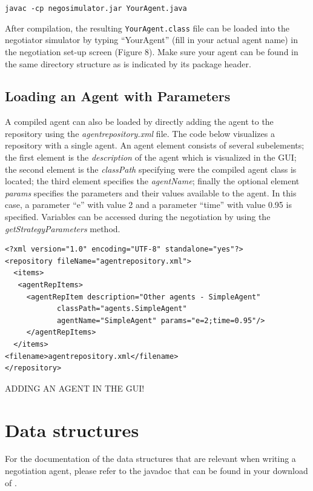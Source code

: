 \documentclass[]{article}
\begin{document}
\texttt{javac -cp negosimulator.jar YourAgent.java}

After compilation, the resulting \texttt{YourAgent.class} file can be loaded into the negotiator simulator by typing ``YourAgent'' (fill in your actual agent name) in the negotiation set-up screen (Figure 8). Make sure your agent can be found in the same directory structure as is indicated by its package header.

\subsection{Loading an Agent with Parameters}
A compiled agent can also be loaded by directly adding the agent to the repository using the \textit{agentrepository.xml} file. The code below visualizes a repository with a single agent. An agent element consists of several subelements; the first element is the \textit{description} of the agent which is visualized in the GUI; the second element is the \textit{classPath} specifying were the compiled agent class is located; the third element specifies the \textit{agentName}; finally the optional element \textit{params} specifies the parameters and their values available to the agent. In this case, a parameter ``e'' with value 2 and a parameter ``time'' with value 0.95 is specified. Variables can be accessed during the negotiation by using the \textit{getStrategyParameters} method.

\begin{lstlisting}
<?xml version="1.0" encoding="UTF-8" standalone="yes"?>
<repository fileName="agentrepository.xml">
  <items>
   <agentRepItems>
     <agentRepItem description="Other agents - SimpleAgent"
			classPath="agents.SimpleAgent"
			agentName="SimpleAgent" params="e=2;time=0.95"/>
     </agentRepItems>
  </items>
<filename>agentrepository.xml</filename>
</repository>
\end{lstlisting}
 
ADDING AN AGENT IN THE GUI!

\section{Data structures}
For the documentation of the data structures that are relevant when writing a negotiation agent, please refer to the javadoc that can be found in your download of \Genius. 
\end{document}
